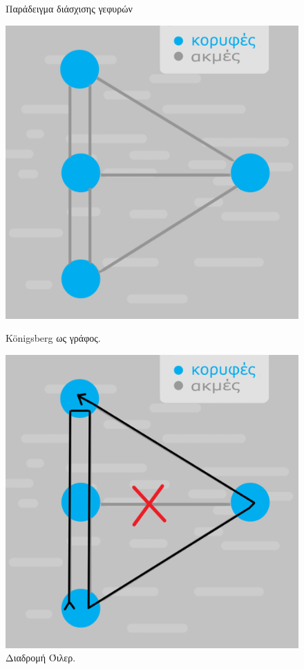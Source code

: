 \begin{figure}[ht]
\begin{minipage}[c]{.46\linewidth}
        \caption{Παράδειγμα διάσχισης γεφυρών}
        \label{2}
    \end{minipage}
\end{figure}
\begin{figure}[ht]
    \begin{minipage}[c]{.46\linewidth}
        \centering
        \includegraphics[scale=0.15]{2947_thesis/pictures/konigsberGraph.png}
        \caption{Königsberg ως γράφος.}
        \label{3}
    \end{minipage}
    \hfill%
    \begin{minipage}[c]{.46\linewidth}
        \centering
        \includegraphics[scale=0.15]{2947_thesis/pictures/konigsbergEuler.png}
        \caption{Διαδρομή Όιλερ.}
        \label{4}
    \end{minipage}
\end{figure} 
